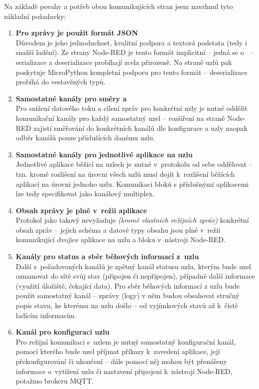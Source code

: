 Na základě povahy a potřeb obou komunikujících stran jsem navrhnul tyto základní požadavky:
\begin{enumerate}
    \item \textbf{Pro zprávy je použit formát JSON} \\
    Důvodem je jeho jednoduchost, kvalitní podpora a textová podstata (tedy i snažší ladění).
    Ze strany Node-RED je tento formát implicitní -- jedná se o~ -- serializace a
    deserializace probíhají zcela přirozeně.
    Na straně uzlů pak poskytuje MicroPython kompletní podporu pro tento formát -- deserializace probíhá do
    vestavěných typů.

    \item \textbf{Samostatné kanály pro směry  a } \\
    Pro snížení datového toku a cílení zpráv pro konkrétní uzly je nutné oddělit komunikační kanály pro každý
    samostatný uzel -- rozšíření na straně Node-RED zajistí směřování do konkrétních kanálů dle konfigurace a uzly
    naopak odběr kanálů pouze příslušících danému uzlu.

    \item \textbf{Samostatné kanály pro jednotlivé aplikace na uzlu} \\
    Jednotlivé aplikace běžící na uzlech je nutné v~protokolu od sebe oddělovat -- tzn. kromě rozlišení na úrovni
    všech uzlů musí dojít k~rozlišení běžících aplikací na úrovni jednoho uzlu.
    Komunikaci bloků s příslušnými aplikacemi lze tedy specifikovat jako kanálový multiplex.

    \item \textbf{Obsah zprávy je plně v~režii aplikace} \\
    Protokol jako takový nevyžaduje \emph{(kromě vlastních režijních zpráv)} konkrétní obsah zpráv -- jejich schéma a
    datové typy obsahu jsou plně v~režii komunikující dvojice aplikace na uzlu a bloku v~nástroji Node-RED.

    \item \textbf{Kanály pro status a sběr běhových informací z~uzlu} \\
    Další z~požadovaných kanálů je zpětný kanál statusu uzlu, kterým bude uzel oznamovat do sítě svůj stav (připojen či
    nepřipojen), případně další informace (využití úložiště, čekající data).
    Pro sběr běhových informací z uzlu bude použit samostatný kanál -- zprávy (logy) v něm budou obsahovat stručný
    popis stavu, ke kterému na uzlu došlo -- od vyjímkových stavů až k~čistě ladícím informacím.

    \item \textbf{Kanál pro konfiguraci uzlu} \\
    Pro režijní komunikaci s~uzlem je nutný samostatný konfigurační kanál, pomocí kterého bude uzel příjmat příkazy
    k~zavedení aplikace, její překonfigurování či ukončení -- dále pomocí něj mohou být přenášeny informace o~vytížení
    uzlu či nastavení připojení k~nástroji Node-RED, potažmo brokeru MQTT.
\end{enumerate}

